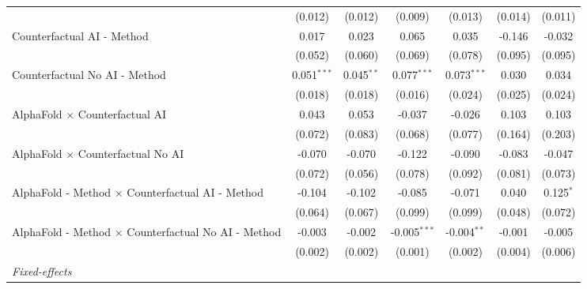 \begin{tabular}{lcccccc}
                                                              & (0.012)       & (0.012)       & (0.009)        & (0.013)       & (0.014)       & (0.011)\\   
   Counterfactual AI - Method                                 & 0.017         & 0.023         & 0.065          & 0.035         & -0.146        & -0.032\\   
                                                              & (0.052)       & (0.060)       & (0.069)        & (0.078)       & (0.095)       & (0.095)\\   
   Counterfactual No AI - Method                              & 0.051$^{***}$ & 0.045$^{**}$  & 0.077$^{***}$  & 0.073$^{***}$ & 0.030         & 0.034\\   
                                                              & (0.018)       & (0.018)       & (0.016)        & (0.024)       & (0.025)       & (0.024)\\   
   AlphaFold $\times$ Counterfactual AI                       & 0.043         & 0.053         & -0.037         & -0.026        & 0.103         & 0.103\\   
                                                              & (0.072)       & (0.083)       & (0.068)        & (0.077)       & (0.164)       & (0.203)\\   
   AlphaFold $\times$ Counterfactual No AI                    & -0.070        & -0.070        & -0.122         & -0.090        & -0.083        & -0.047\\   
                                                              & (0.072)       & (0.056)       & (0.078)        & (0.092)       & (0.081)       & (0.073)\\   
   AlphaFold - Method $\times$ Counterfactual AI - Method     & -0.104        & -0.102        & -0.085         & -0.071        & 0.040         & 0.125$^{*}$\\   
                                                              & (0.064)       & (0.067)       & (0.099)        & (0.099)       & (0.048)       & (0.072)\\   
   AlphaFold - Method $\times$ Counterfactual No AI - Method  & -0.003        & -0.002        & -0.005$^{***}$ & -0.004$^{**}$ & -0.001        & -0.005\\   
                                                              & (0.002)       & (0.002)       & (0.001)        & (0.002)       & (0.004)       & (0.006)\\   
   \midrule
   \emph{Fixed-effects}\\

\end{tabular}
